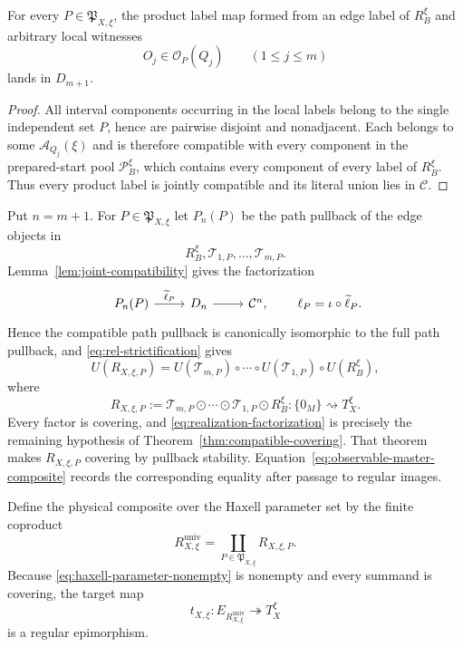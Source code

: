 \begin{lemma}\label{lem:joint-compatibility}
For every $P\in\mathfrak P_{X,\xi}$, the product label map formed from an edge label of $R_B^\xi$ and arbitrary local witnesses
\[
O_j\in\mathscr O_P(Q_j)
\qquad(1\le j\le m)
\]
lands in $D_{m+1}$.
\end{lemma}

\begin{proof}
All interval components occurring in the local labels belong to the single independent set $P$, hence are pairwise disjoint and nonadjacent.  Each belongs to some $\mathcal A_{Q_j}(\xi)$ and is therefore compatible with every component in the prepared-start pool $\mathscr P_B^\xi$, which contains every component of every label of $R_B^\xi$.  Thus every product label is jointly compatible and its literal union lies in $\mathcal C$.
\end{proof}

Put $n=m+1$.  For $P\in\mathfrak P_{X,\xi}$ let $P_n(P)$ be the path pullback of the edge objects in
\[
R_B^\xi,\mathscr T_{1,P},\ldots,\mathscr T_{m,P}.
\]
Lemma~\ref{lem:joint-compatibility} gives the factorization
\begin{equation}\label{eq:realization-factorization}
\begin{tikzcd}
P_n(P) \arrow[r,"{\widetilde\ell_P}"] & D_n \arrow[r] & \mathcal C^n,
\end{tikzcd}
\qquad
\ell_P=\iota\circ\widetilde\ell_P.
\end{equation}
Hence the compatible path pullback is canonically isomorphic to the full path pullback, and \eqref{eq:rel-strictification} gives
\begin{equation}\label{eq:observable-master-composite}
U(R_{X,\xi,P})
=
U(\mathscr T_{m,P})\circ\cdots\circ
U(\mathscr T_{1,P})\circ U(R_B^\xi),
\end{equation}
where
\begin{equation}\label{eq:physical-master-composite}
R_{X,\xi,P}
:=
\mathscr T_{m,P}\odot\cdots\odot
\mathscr T_{1,P}\odot R_B^\xi
:\{0_M\}\rightsquigarrow T_X^\xi.
\end{equation}
Every factor is covering, and \eqref{eq:realization-factorization} is precisely the remaining hypothesis of Theorem~\ref{thm:compatible-covering}.  That theorem makes $R_{X,\xi,P}$ covering by pullback stability.  Equation~\eqref{eq:observable-master-composite} records the corresponding equality after passage to regular images.

Define the physical composite over the Haxell parameter set by the finite coproduct
\begin{equation}\label{eq:universal-physical-composite}
R_{X,\xi}^{\mathrm{univ}}
=
\coprod_{P\in\mathfrak P_{X,\xi}}R_{X,\xi,P}.
\end{equation}
Because \eqref{eq:haxell-parameter-nonempty} is nonempty and every summand is covering, the target map
\begin{equation}\label{eq:universal-realization-epi}
t_{X,\xi}:E_{R_{X,\xi}^{\mathrm{univ}}}
\twoheadrightarrow T_X^\xi
\end{equation}
is a regular epimorphism.

